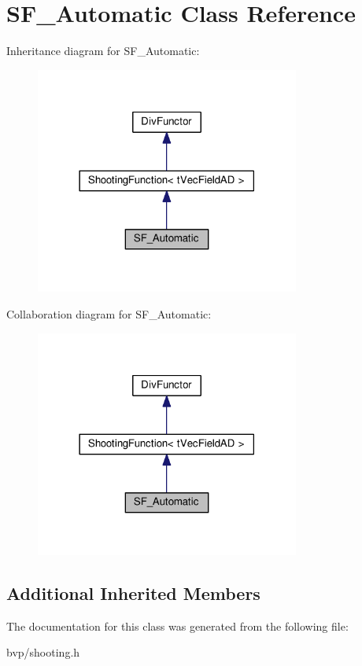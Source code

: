 \hypertarget{classSF__Automatic}{}\section{S\+F\+\_\+\+Automatic Class Reference}
\label{classSF__Automatic}


Inheritance diagram for S\+F\+\_\+\+Automatic\+:
\nopagebreak
\begin{figure}[H]
\begin{center}
\leavevmode
\includegraphics[width=246pt]{classSF__Automatic__inherit__graph}
\end{center}
\end{figure}


Collaboration diagram for S\+F\+\_\+\+Automatic\+:
\nopagebreak
\begin{figure}[H]
\begin{center}
\leavevmode
\includegraphics[width=246pt]{classSF__Automatic__coll__graph}
\end{center}
\end{figure}
\subsection*{Additional Inherited Members}


The documentation for this class was generated from the following file\+:\begin{DoxyCompactItemize}
\item 
bvp/shooting.\+h\end{DoxyCompactItemize}
